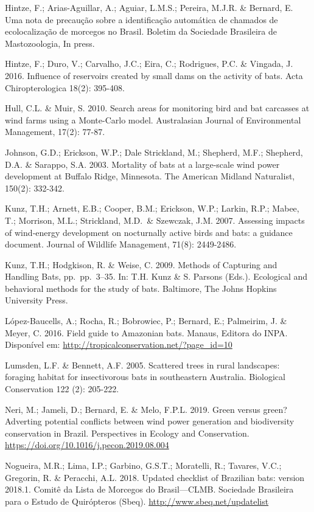 \documentclass[
]{scrbook}
\begin{document}
Hintze, F.; Arias-Aguillar, A.; Aguiar, L.M.S.; Pereira, M.J.R. \& Bernard, E. Uma nota de precaução sobre a identificação automática de chamados de ecolocalização de morcegos no Brasil. Boletim da Sociedade Brasileira de Mastozoologia, In press.

Hintze, F.; Duro, V.; Carvalho, J.C.; Eira, C.; Rodrigues, P.C. \& Vingada, J. 2016. Influence of reservoirs created by small dams on the activity of bats. Acta Chiropterologica 18(2): 395-408.

Hull, C.L. \& Muir, S. 2010. Search areas for monitoring bird and bat carcasses at wind farms using a Monte-Carlo model. Australasian Journal of Environmental Management, 17(2): 77-87.

Johnson, G.D.; Erickson, W.P.; Dale Strickland, M.; Shepherd, M.F.; Shepherd, D.A. \& Sarappo, S.A. 2003. Mortality of bats at a large-scale wind power development at Buffalo Ridge, Minnesota. The American Midland Naturalist, 150(2): 332-342.

Kunz, T.H.; Arnett, E.B.; Cooper, B.M.; Erickson, W.P.; Larkin, R.P.; Mabee, T.; Morrison, M.L.; Strickland, M.D.~\& Szewczak, J.M. 2007. Assessing impacts of wind‐energy development on nocturnally active birds and bats: a guidance document. Journal of Wildlife Management, 71(8): 2449-2486.

Kunz, T.H.; Hodgkison, R. \& Weise, C. 2009. Methods of Capturing and Handling Bats, pp.~pp.~3--35. In: T.H. Kunz \& S. Parsons (Eds.). Ecological and behavioral methods for the study of bats. Baltimore, The Johns Hopkins University Press.

López-Baucells, A.; Rocha, R.; Bobrowiec, P.; Bernard, E.; Palmeirim, J. \& Meyer, C. 2016. Field guide to Amazonian bats. Manaus, Editora do INPA. Disponível em: \url{http://tropicalconservation.net/?page_id=10}

Lumsden, L.F. \& Bennett, A.F. 2005. Scattered trees in rural landscapes: foraging habitat for insectivorous bats in southeastern Australia. Biological Conservation 122 (2): 205-222.

Neri, M.; Jameli, D.; Bernard, E. \& Melo, F.P.L. 2019. Green versus green? Adverting potential conflicts between wind power generation and biodiversity conservation in Brazil. Perspectives in Ecology and Conservation. \url{https://doi.org/10.1016/j.pecon.2019.08.004}

Nogueira, M.R.; Lima, I.P.; Garbino, G.S.T.; Moratelli, R.; Tavares, V.C.; Gregorin, R. \& Peracchi, A.L. 2018. Updated checklist of Brazilian bats: version 2018.1. Comitê da Lista de Morcegos do Brasil---CLMB. Sociedade Brasileira para o Estudo de Quirópteros (Sbeq). \url{http://www.sbeq.net/updatelist}
\end{document}
